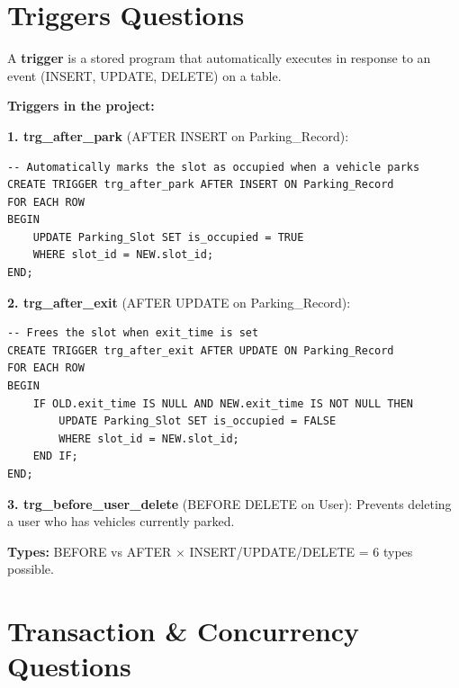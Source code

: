 \documentclass[12pt,a4paper]{article}
\begin{document}
\section{Triggers Questions}

\begin{questionbox}
\end{questionbox}
\begin{answerbox}
A \textbf{trigger} is a stored program that automatically executes in response to an event (INSERT, UPDATE, DELETE) on a table.

\textbf{Triggers in the project:}

\textbf{1. trg\_after\_park} (AFTER INSERT on Parking\_Record):
\begin{lstlisting}
-- Automatically marks the slot as occupied when a vehicle parks
CREATE TRIGGER trg_after_park AFTER INSERT ON Parking_Record
FOR EACH ROW
BEGIN
    UPDATE Parking_Slot SET is_occupied = TRUE
    WHERE slot_id = NEW.slot_id;
END;
\end{lstlisting}

\textbf{2. trg\_after\_exit} (AFTER UPDATE on Parking\_Record):
\begin{lstlisting}
-- Frees the slot when exit_time is set
CREATE TRIGGER trg_after_exit AFTER UPDATE ON Parking_Record
FOR EACH ROW
BEGIN
    IF OLD.exit_time IS NULL AND NEW.exit_time IS NOT NULL THEN
        UPDATE Parking_Slot SET is_occupied = FALSE
        WHERE slot_id = NEW.slot_id;
    END IF;
END;
\end{lstlisting}

\textbf{3. trg\_before\_user\_delete} (BEFORE DELETE on User):
Prevents deleting a user who has vehicles currently parked.

\textbf{Types:} BEFORE vs AFTER $\times$ INSERT/UPDATE/DELETE = 6 types possible.
\end{answerbox}

\section{Transaction \& Concurrency Questions}
\end{document}

